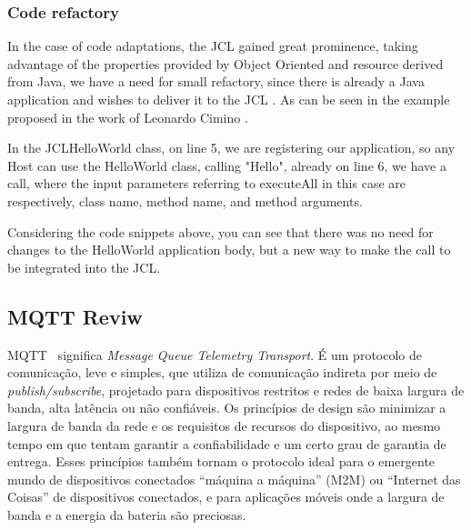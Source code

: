 \documentclass[12pt]{article}
\begin{document}

\subsubsection{Code refactory}

In the case of code adaptations, the JCL gained great prominence, taking advantage of the properties provided by Object Oriented and resource derived from Java, we have a need for small refactory, since there is already a Java application and wishes to deliver it to the JCL . As can be seen in the example proposed in the work of Leonardo Cimino \cite{Cimino2018}.

\begin{center}
	
	
	
\end{center}

In the JCLHelloWorld class, on line 5, we are registering our application, so any Host can use the HelloWorld class, calling "Hello", already on line 6, we have a call, where the input parameters referring to executeAll in this case are respectively, class name, method name, and method arguments.

Considering the code snippets above, you can see that there was no need for changes to the HelloWorld application body, but a new way to make the call to be integrated into the JCL.
\subsection{MQTT Reviw}

MQTT~\cite{mqtt} significa \textit{Message Queue Telemetry Transport}. É um protocolo de comunicação, leve e simples, que utiliza de comunicação indireta por meio de \textit{publish/subscribe}, projetado para dispositivos restritos e redes de baixa largura de banda, alta latência ou não confiáveis. Os princípios de design são minimizar a largura de banda da rede e os requisitos de recursos do dispositivo, ao mesmo tempo em que tentam garantir a confiabilidade e um certo grau de garantia de entrega. Esses princípios também tornam o protocolo ideal para o emergente mundo de dispositivos conectados “máquina a máquina” (M2M) ou “Internet das Coisas” de dispositivos conectados, e para aplicações móveis onde a largura de banda e a energia da bateria são preciosas.
\end{document}
